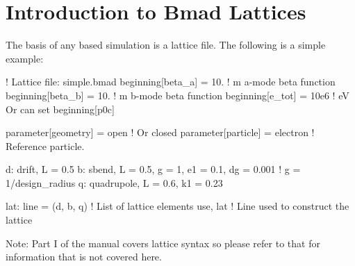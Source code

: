 \documentclass{hitec}     %
\newcommand{\Section}[1]{\section{#1}\vspace*{-1ex}}
\begin{document}
\newpage

\Section{Introduction to Bmad Lattices}
\label{s:bmad.intro}

The basis of any \bmad based simulation is a lattice file. The following is a
simple example:
\begin{code}
! Lattice file: simple.bmad
beginning[beta_a] = 10.   ! m  a-mode beta function
beginning[beta_b] = 10.   ! m  b-mode beta function
beginning[e_tot] = 10e6   ! eV   Or can set beginning[p0c]

parameter[geometry] = open          ! Or closed
parameter[particle] = electron      ! Reference particle.

d: drift, L = 0.5
b: sbend, L = 0.5, g = 1, e1 = 0.1, dg = 0.001   ! g = 1/design_radius
q: quadrupole, L = 0.6, k1 = 0.23

lat: line = (d, b, q)       ! List of lattice elements
use, lat                    ! Line used to construct the lattice
\end{code}
Note: Part I of the \bmad manual covers lattice syntax so please refer to that for information that
is not covered here.
\end{document}
